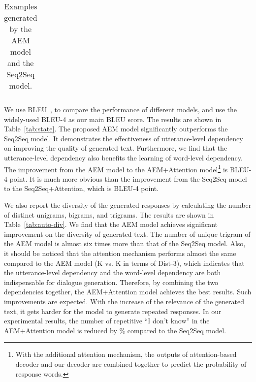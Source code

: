 \documentclass[11pt,a4paper]{article}
\begin{document}
\begin{CJK}{UTF8}{song}
\begin{table}[t]
\begin{tabular}{p{0.9\linewidth}}
    
\end{tabular}
    \caption{Examples generated by the AEM model and the Seq2Seq model. }
    \label{samplecases}
\end{table}









We use BLEU~\cite{DBLP:conf/acl/PapineniRWZ02}, to compare the performance of different models, and use the widely-used BLEU-4 as our main BLEU score. The results are shown in Table~\ref{tab:state}.
The proposed AEM model significantly outperforms the Seq2Seq model.
It demonstrates the effectiveness of utterance-level dependency on improving the quality of generated text. Furthermore, we find that the utterance-level dependency also benefits the learning of word-level dependency. 
The improvement from the AEM model to the AEM+Attention model\footnote{With the additional attention mechanism, the outputs of attention-based decoder and our decoder are combined together to predict the probability of response words.} is  BLEU-4 point. It is much more obvious than the improvement from the Seq2Seq model to the Seq2Seq+Attention, which is  BLEU-4 point. 















We also report the diversity of the generated responses by calculating the number of distinct unigrams, bigrams, and trigrams. The results are shown in Table~\ref{tab:auto-div}. We find that the AEM model achieves significant improvement on the diversity of generated text. The number of unique trigram of the AEM model is almost six times more than that of the Seq2Seq model. Also, it should be noticed that the attention mechanism performs almost the same compared to the AEM model (K vs. K in terms of Dist-3), which indicates that the utterance-level dependency and the word-level dependency are both indispensable for dialogue generation. Therefore, by combining the two dependencies together, the AEM+Attention model achieves the best results. Such improvements are expected. With the increase of the relevance of the generated text, it gets harder for the model to generate repeated responses. In our experimental results, the number of repetitive ``I don't know'' in the AEM+Attention model is reduced by \% compared to the Seq2Seq model.  



\end{CJK}
\end{document}
